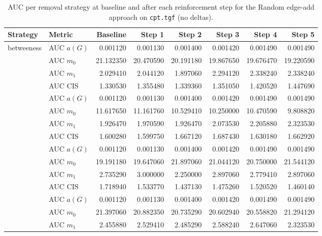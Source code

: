 \begin{table}[htbp]
  \centering
  \caption{AUC per removal strategy at baseline and after each reinforcement step for the Random edge-add approach on \texttt{cpt.tgf} (no deltas).}
  \label{tab:cpt-random_add-auc}
  \begin{tabular}{llrrrrrr}
    \toprule
    \textbf{Strategy} & \textbf{Metric} & \textbf{Baseline} & \textbf{Step 1} & \textbf{Step 2} & \textbf{Step 3} & \textbf{Step 4} & \textbf{Step 5} \\
    \midrule
    \multirow{4}{*}{betweeness} & AUC $a(G)$ & 0.001120 & 0.001130 & 0.001400 & 0.001420 & 0.001490 & 0.001490 \\
    & AUC $m_0$ & 21.132350 & 20.470590 & 20.191180 & 19.867650 & 19.676470 & 19.220590 \\
    & AUC $m_1$ & 2.029410 & 2.044120 & 1.897060 & 2.294120 & 2.338240 & 2.338240 \\
    & AUC CIS & 1.330530 & 1.355480 & 1.339360 & 1.351050 & 1.420520 & 1.447690 \\
    \addlinespace
    \multirow{4}{*}{closeness} & AUC $a(G)$ & 0.001120 & 0.001130 & 0.001400 & 0.001420 & 0.001490 & 0.001490 \\
    & AUC $m_0$ & 11.617650 & 11.161760 & 10.529410 & 10.250000 & 10.470590 & 9.808820 \\
    & AUC $m_1$ & 1.926470 & 1.970590 & 1.926470 & 2.073530 & 2.205880 & 2.323530 \\
    & AUC CIS & 1.600280 & 1.599750 & 1.667120 & 1.687430 & 1.630180 & 1.662920 \\
    \addlinespace
    \multirow{4}{*}{core influence} & AUC $a(G)$ & 0.001120 & 0.001130 & 0.001400 & 0.001420 & 0.001490 & 0.001490 \\
    & AUC $m_0$ & 19.191180 & 19.647060 & 21.897060 & 21.044120 & 20.750000 & 21.544120 \\
    & AUC $m_1$ & 2.735290 & 3.000000 & 2.250000 & 2.897060 & 2.779410 & 2.897060 \\
    & AUC CIS & 1.718940 & 1.533770 & 1.437130 & 1.475260 & 1.520520 & 1.460140 \\
    \addlinespace
    \multirow{4}{*}{degree} & AUC $a(G)$ & 0.001120 & 0.001130 & 0.001400 & 0.001420 & 0.001490 & 0.001490 \\
    & AUC $m_0$ & 21.397060 & 20.882350 & 20.735290 & 20.602940 & 20.558820 & 21.294120 \\
    & AUC $m_1$ & 2.455880 & 2.529410 & 2.485290 & 2.588240 & 2.647060 & 2.323530 \\

\end{tabular}
\end{table}
